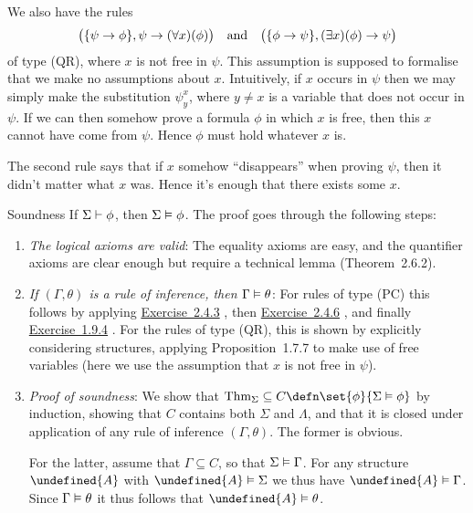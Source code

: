 \documentclass[article, a4paper, 11pt, oneside]{memoir}
\let\mathfrak\undefined
\numberwithin{equation}{chapter}
\newcommand{\frakA}{\mathfrak{A}}
\newcommand{\RNum}[1]{\uppercase\expandafter{\romannumeral #1\relax}}
\newcommand{\exref}[1]{%
    \hyperref[ex:#1]{Exercise~#1}%
}
\theoremstyle{nonumberplain}
\begin{document}
\begin{notelist}
    We also have the rules
    \begin{equation*}
        \bigl( \{ \psi \rightarrow \phi \}, \psi \rightarrow (\forall x)(\phi) \bigr)
        \quad \text{and} \quad
        \bigl( \{ \phi \rightarrow \psi \}, (\exists x)(\phi) \rightarrow \psi \bigr)
    \end{equation*}
    of type (QR), where $x$ is not free in $\psi$. This assumption is supposed to formalise that we make no assumptions about $x$. Intuitively, if $x$ occurs in $\psi$ then we may simply make the substitution $\psi^x_y$, where $y \neq x$ is a variable that does not occur in $\psi$. If we can then somehow prove a formula $\phi$ in which $x$ is free, then this $x$ cannot have come from $\psi$. Hence $\phi$ must hold whatever $x$ is.
    
    The second rule says that if $x$ somehow \enquote{disappears} when proving $\psi$, then it didn't matter what $x$ was. Hence it's enough that there exists some $x$.

    \item[Soundness]
    If $\Sigma \vdash \phi$, then $\Sigma \vDash \phi$. The proof goes through the following steps:
    \begin{enumerate}
        \item \emph{The logical axioms are valid}: The equality axioms are easy, and the quantifier axioms are clear enough but require a technical lemma (Theorem~2.6.2).
        
        \item \emph{If $(\Gamma,\theta)$ is a rule of inference, then $\Gamma \vDash \theta$}: For rules of type (PC) this follows by applying \exref{2.4.3}, then \exref{2.4.6}, and finally \exref{1.9.4}. For the rules of type (QR), this is shown by explicitly considering structures, applying Proposition~1.7.7 to make use of free variables (here we use the assumption that $x$ is not free in $\psi$).
        
        \item \emph{Proof of soundness}: We show that $\thm{\Sigma} \subseteq C \defn \set{\phi}{\Sigma \limplies \phi}$ by induction, showing that $C$ contains both $\Sigma$ and $\Lambda$, and that it is closed under application of any rule of inference $(\Gamma,\theta)$. The former is obvious.
        
        For the latter, assume that $\Gamma \subseteq C$, so that $\Sigma \vDash \Gamma$. For any structure $\frakA$ with $\frakA \models \Sigma$ we thus have $\frakA \models \Gamma$. Since $\Gamma \vDash \theta$ it thus follows that $\frakA \models \theta$.
    \end{enumerate}
\end{notelist}
\end{document}
